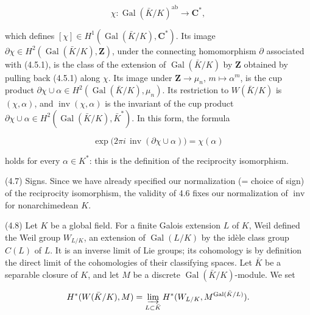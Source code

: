 \documentclass[9pt,twoside]{extarticle}
\begin{document}
{\[
\chi:\operatorname{Gal}(\bar K/K)^{\mathrm{ab}}\longrightarrow\mathbf C^*,
\]

which defines \([\chi]\in H^1(\operatorname{Gal}(\bar K/K),\mathbf C^*)\). Its image \(\partial\chi\in H^2(\operatorname{Gal}(\bar K/K),\mathbf Z)\), under the connecting homomorphism \(\partial\) associated with (4.5.1), is the class of the extension of \(\operatorname{Gal}(\bar K/K)\) by \(\mathbf Z\) obtained by pulling back (4.5.1) along \(\chi\). Its image under \(\mathbf Z\to\mu_n\), \(m\mapsto\alpha^m\), is the cup product \(\partial\chi\cup\alpha\in H^2(\operatorname{Gal}(\bar K/K),\mu_n)\). Its restriction to \(W(\bar K/K)\) is \((\chi,\alpha)\), and \(\operatorname{inv}(\chi,\alpha)\) is the invariant of the cup product \(\partial\chi\cup\alpha\in H^2(\operatorname{Gal}(\bar K/K),\bar K^*)\). In this form, the formula\par

\[
\exp\bigl(2\pi i\,\operatorname{inv}(\partial\chi\cup\alpha)\bigr)=\chi(\alpha)
\]

holds for every \(\alpha\in K^*\): this is the definition of the reciprocity isomorphism.\par

(4.7) Signs. Since we have already specified our normalization (= choice of sign) of the reciprocity isomorphism, the validity of 4.6 fixes our normalization of \(\operatorname{inv}\) for nonarchimedean \(K\).\par

(4.8) Let \(K\) be a global field. For a finite Galois extension \(L\) of \(K\), Weil defined the Weil group \(W_{L/K}\), an extension of \(\operatorname{Gal}(L/K)\) by the idèle class group \(C(L)\) of \(L\). It is an inverse limit of Lie groups; its cohomology is by definition the direct limit of the cohomologies of their classifying spaces. Let \(\bar K\) be a separable closure of \(K\), and let \(M\) be a discrete \(\operatorname{Gal}(\bar K/K)\)-module. We set\par

\[
H^*(W(\bar K/K),M)=\varinjlim_{L\subset\bar K}H^*(W_{L/K},M^{\operatorname{Gal}(\bar K/L)}).
\]
}
\end{document}
